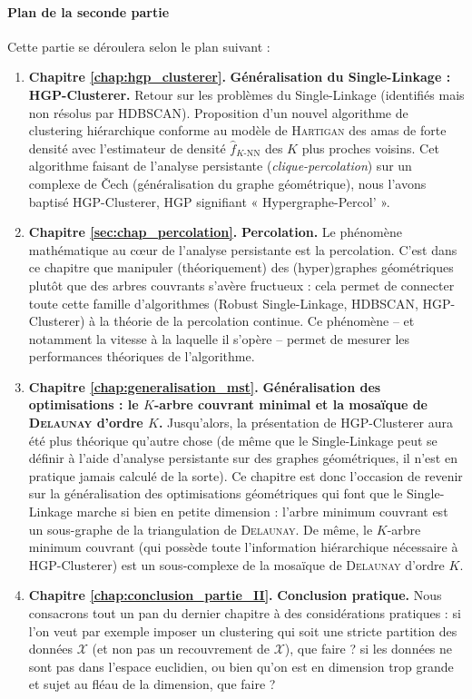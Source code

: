 \documentclass{these-ISSS} %
\begin{document}
\paragraph{Plan de la seconde partie}
Cette partie se déroulera selon le plan suivant :
\begin{enumerate}
    \item \textbf{Chapitre \ref{chap:hgp_clusterer}.} \textbf{Généralisation du Single-Linkage : HGP-Clusterer.} Retour sur les problèmes du Single-Linkage (identifiés mais non résolus par HDBSCAN). Proposition d'un nouvel algorithme de clustering hiérarchique conforme au modèle de \textsc{Hartigan} des amas de forte densité avec l'estimateur de densité $\widehat f_{K\text{-NN}}$ des $K$ plus proches voisins. Cet algorithme faisant de l'analyse persistante (\emph{clique-percolation}) sur un complexe de \v Cech (généralisation du graphe géométrique), nous l'avons baptisé HGP-Clusterer, HGP signifiant « Hypergraphe-Percol' ».
    \item \textbf{Chapitre \ref{sec:chap_percolation}.} \textbf{Percolation.} Le phénomène mathématique au cœur de l'analyse persistante est la percolation. C'est dans ce chapitre que manipuler (théoriquement) des (hyper)graphes géométriques plutôt que des arbres couvrants s'avère fructueux : cela permet de connecter toute cette famille d'algorithmes (Robust Single-Linkage, HDBSCAN, HGP-Clusterer) à la théorie de la percolation continue. Ce phénomène -- et notamment la vitesse à la laquelle il s'opère -- permet de mesurer les performances théoriques de l'algorithme.
    \item \textbf{Chapitre \ref{chap:generalisation_mst}.} \textbf{Généralisation des optimisations : le $K$-arbre couvrant minimal et la mosaïque de \textsc{Delaunay} d'ordre $K$.} 
    Jusqu'alors, la présentation de HGP-Clusterer aura été plus théorique qu'autre chose (de même que le Single-Linkage peut se définir à l'aide d'analyse persistante sur des graphes géométriques, il n'est en pratique jamais calculé de la sorte). Ce chapitre est donc l'occasion de revenir sur la généralisation des optimisations géométriques qui font que le Single-Linkage marche si bien en petite dimension : l'arbre minimum couvrant est un sous-graphe de la triangulation de \textsc{Delaunay}. De même, le $K$-arbre minimum couvrant (qui possède toute l'information hiérarchique nécessaire à HGP-Clusterer) est un sous-complexe de la mosaïque de \textsc{Delaunay} d'ordre $K$.
    \item \textbf{Chapitre \ref{chap:conclusion_partie_II}.} \textbf{Conclusion pratique.} Nous consacrons tout un pan du dernier chapitre à des considérations pratiques : si l'on veut par exemple imposer un clustering qui soit une stricte partition des données $\mathcal X$ (et non pas un recouvrement de $\mathcal X$), que faire ? si les données ne sont pas dans l'espace euclidien, ou bien qu'on est en dimension trop grande et sujet au fléau de la dimension, que faire ? 


\end{enumerate}
\end{document}
